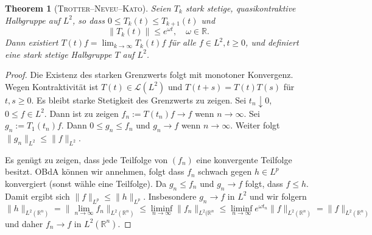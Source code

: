 \documentclass[11pt]{article}
\newtheorem{thm}{Theorem}
\theoremstyle{break}
\begin{document}
\vspace{.25cm}

\begin{thm}[\textsc{Trotter--Neveu--Kato}]
Seien $T_k$ stark stetige, quasikontraktive Halbgruppe  auf $L^2$, so dass $0\le T_k(t) \le T_{k+1}(t)$ und
\begin{equation}
\|T_k(t)\|\le e^{\omega t},\quad \omega \in \mathbb R.
\end{equation}  
Dann existiert $T(t)f=\lim_{k\to \infty} T_k(t)f$ für alle $f\in L^2, t\ge 0$, und definiert eine stark stetige Halbgruppe $T$ auf $L^2$. 
\end{thm}

\begin{proof}
Die Existenz des starken Grenzwerts folgt mit monotoner Konvergenz.  Wegen Kontraktivität ist $T(t)\in \mathcal L(L^2)$ und $T(t+s)=T(t) T(s)$ für $t,s\ge 0$.  Es bleibt starke Stetigkeit des Grenzwerts zu zeigen.  Sei $t_n\downarrow 0$, $0\le f\in L^2$.  Dann ist zu zeigen $f_n:=T(t_n)f\to f$ wenn $n\to \infty$. Sei $g_n:=T_1(t_n) f$. Dann $0\le g_n \le f_n$ und $g_n \to f$ wenn $n\to \infty$. Weiter folgt $\|g_n\|_{L^2} \le \|f\|_{L^2}$.

Es genügt zu zeigen, dass jede Teilfolge von $(f_n)$ eine konvergente Teilfolge besitzt.  OBdA können wir annehmen, folgt dass $f_n$ schwach gegen $h\in L^p$ konvergiert (sonst wähle eine Teilfolge).  Da $g_n \le f_n$ und $g_n \to f$ folgt, dass $f\le h$.  Damit ergibt sich $\| f\|_{L^p}\le \|h\|_{L^p}$. 
Insbesondere $g_n \to f$ in $L^2$ und wir folgern
\begin{equation}
\| h\|_{L^2(\mathbb R^n)} =\| \lim_{n\to \infty} f_n\|_{L^2(\mathbb R^n)} \le \liminf_{n\to \infty} \| f_n\|_{L^2(\mathbb R^n}\le \liminf_{n\to \infty} e^{\omega t_n} \|f\|_{L^2(\mathbb R^n)}=\| f\|_{L^2(\mathbb R^n)}
\end{equation}
und daher $f_n\to f$ in $L^2(\mathbb R^n)$.
\end{proof}
 
\end{document}

